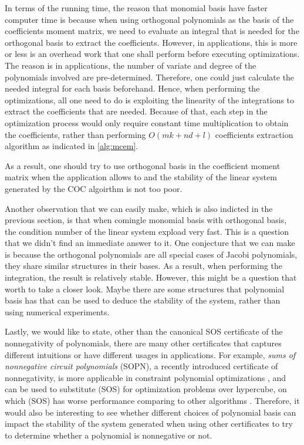 \documentclass[12pt]{amsart}
\numberwithin{equation}{section}
\theoremstyle{definition}
\numberwithin{thm}{section}
\begin{document}
In terms of the running time, the reason that monomial basis have faster computer time is because when using orthogonal polynomials as the basis of the coefficients moment matrix, 
we need to evaluate an integral that is needed for the orthogonal basis to extract the coefficients. 
However, in applications, this is more or less is an overhead work that one shall perform before executing optimizations. 
The reason is in applications, the number of variate and degree of the polynomials involved are pre-determined. 
Therefore, one could just calculate the needed integral for each basis beforehand. 
Hence, when performing the optimizations, 
all one need to do is exploiting the linearity of the integrations to extract the coefficients that are needed. 
Because of that, each step in the optimization process would only require constant time multiplication to 
obtain the coefficients, rather than performing $O(mk + nd + l)$ coefficients extraction algorithm as indicated in \ref{alg:mcem}.

As a result, one should try to use orthogonal basis in the coefficient moment matrix when the application allows to and 
the stability of the linear system generated by the COC algoirthm is not too poor.

Another observation that we can easily make, which is also indicted in the previous section, 
is that when comingle monomial basis with orthogonal basis, the condition number of the linear system expload very fast. 
This is a question that we didn't find an immediate answer to it. 
One conjecture that we can make is because the orthogonal polynomials are all special cases of Jacobi polynomials,
they share similar structures in their bases. As a result, when performing the integration, the result is relatively stable. 
However, this might be a question that worth to take a closer look.
Maybe there are some structures that polynomial basis has that can be used to deduce the stability of the system, rather than using numerical experiments. 

Lastly, we would like to state, other than the canonical SOS certificate of the nonnegativity of polynomials, 
there are many other certificates that captures different intuitions or have different usages in applications. 
For example, \emph{sums of nonnegative circuit polynomials} (SOPN)\cite{Iliman2016}, 
a recently introduced certificate of nonnegativity, is more applicable in constraint polynomial optimizations \cite{wang2021nonnegative},
and can be used to substitute (SOS) for optimization problems over hypercube, on which (SOS) has worse performance comparing to other algorithms \cite{dressler2018optimization}. 
Therefore, it would also be interesting to see whether different choices of polynomial basis can impact the stability of
the system generated when using other certificates to try to determine whether a polynomial is nonnegative or not.






\newpage


\end{document}
